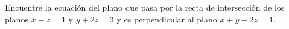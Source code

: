 \item Encuentre la ecuación del plano que pasa por la recta de intersección de los planos $x - z = 1$ y $y + 2z = 3$ y es perpendicular al plano $x + y - 2z = 1$.

